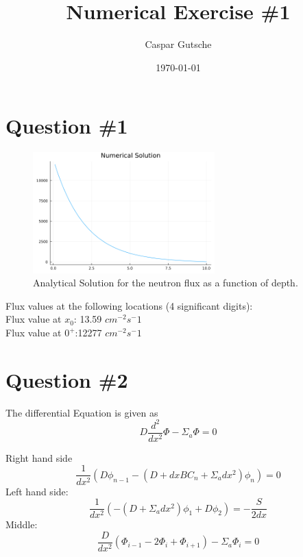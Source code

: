\documentclass[11pt,a4paper]{article}
\begin{document}
\title{Numerical Exercise \#1}
\author{Caspar Gutsche\\  %
}
\date{\today}
\maketitle



\newpage
\section{Question \#1}
\begin{figure}[h]
\includegraphics[width=7cm]{../figs/ex1/ex1_analytical.png}
\centering
\caption{Analytical Solution for the neutron flux as a function of depth.}
\end{figure}
Flux values at the following locations (4 significant digits):\\
Flux value at $x_0$: 13.59 $cm^{-2} s^-1$\\
Flux value at $0^+$:12277  $cm^{-2} s^-1$ \\


\section{Question \#2}

The differential Equation is given as
\begin{equation}
    D \frac{ d^2 }{ dx^2 } \Phi  -  \Sigma_{a}\Phi = 0
\end{equation}

Right hand side
$$
\frac{1}{dx^2} ( D \phi_{n-1} - (D + dx BC_{n} + \Sigma_{a} dx^2)\phi_{n}) = 0
$$
Left hand side:
$$
\frac{1}{dx^2}(-(D + \Sigma_{a} dx^2) \phi_{1} + D\phi_{2}) = -\frac{S}{2dx}
$$
Middle:
$$
\frac{D}{dx^2}(\Phi_{i-1} - 2 \Phi_{i} + \Phi_{i+1}) - \Sigma_{a} \Phi_{i} = 0
$$
\end{document}
